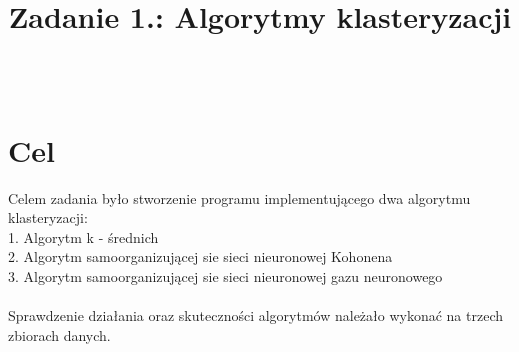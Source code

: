 \documentclass{classrep}
\author{%
  \studentinfo[216806@edu.p.lodz.pl]{Kamil Kowalewski}{216806}\\
  \studentinfo[216920@edu.p.lodz.pl]{Tomasz Witczak}{216920}%
}
\title{Zadanie 1.: Algorytmy klasteryzacji}
\begin{document}
\maketitle
\thispagestyle{fancyplain}

\section{Cel}
{Celem zadania było stworzenie programu implementującego dwa algorytmu klasteryzacji:\\
1. Algorytm k - średnich\\
2. Algorytm samoorganizującej sie sieci nieuronowej Kohonena\\
3. Algorytm samoorganizującej sie sieci nieuronowej gazu neuronowego\\\\
Sprawdzenie działania oraz skuteczności algorytmów należało wykonać na trzech zbiorach danych.
}
\end{document}
